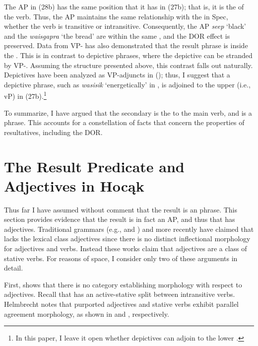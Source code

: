 \documentclass[output=paper]{LSP/langsci}
\begin{document}
The AP in (28b) has the same position that it has in (27b); that is, it is the  of the verb. Thus, the AP maintains the same relationship with the  in Spec, whether the verb is transitive or intransitive. Consequently, the AP \textit{seep} `black' and the  \textit{waisgapra} `the bread' are within the same , and the DOR effect is preserved. Data from VP- has also demonstrated that the result phrase is inside the . This is in contrast to depictive phrases, where the depictive can be stranded by VP-. Assuming the structure presented above, this contrast falls out naturally. Depictives have been analyzed as VP-adjuncts in  (\citealt{LevinRappaportHovav1995}); thus, I suggest that a depictive phrase, such as \textit{wasisik} `energetically' in , is adjoined to the upper  (i.e., vP) in (27b).\footnote{In this paper, I leave it open whether depictives can adjoin to the lower .}

To summarize, I have argued that the  secondary  is the  to the main verb, and is a phrase. This accounts for a constellation of facts that concern the properties of  resultatives, including the DOR.

\section{The Result Predicate and Adjectives in Hocąk} \label{sec:rosen:5}

Thus far I have assumed without comment that the result  is an  phrase. This section provides evidence that the result is in fact an AP, and thus that  has adjectives. Traditional grammars (e.g., \citealt{Lipkind1945} and \citealt{Susman1943}) and more recently \citet{Helmbrecht2006b} have claimed that  lacks the lexical class adjectives since there is no distinct inflectional morphology for adjectives and verbs. Instead these works claim that adjectives are a class of stative verbs. For reasons of space, I consider only two of these arguments in detail.

First, \citet{Helmbrecht2006b} shows that there is no category establishing morphology with respect to adjectives. Recall that  has an active-stative split between intransitive verbs. Helmbrecht notes that purported adjectives and stative verbs exhibit parallel agreement morphology, as shown in  and , respectively.
\end{document}
